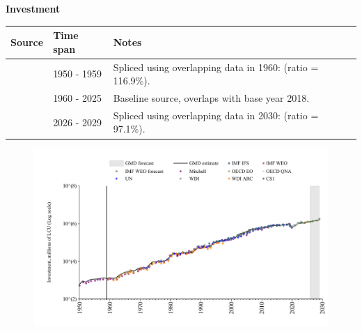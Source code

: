 \documentclass[12pt,a4paper,landscape]{article}
\begin{document}
\begin{adjustbox}{max totalsize={\paperwidth}{\paperheight},center}
\begin{minipage}[t][\textheight][t]{\textwidth}
\vspace*{0.5cm}
{}
\begin{center}
{\Large\bfseries Investment}
\end{center}
\vspace{0.5cm}
\begin{table}[H]
\centering
\small
\begin{tabular}{|l|l|l|}
\hline
\textbf{Source} & \textbf{Time span} & \textbf{Notes} \\
\hline
\rowcolor{white}\cite{Mitchell}& 1950 - 1959 &Spliced using overlapping data in 1960: (ratio = 116.9\%). \\
\rowcolor{lightgray}\cite{OECD_EO}& 1960 - 2025 &Baseline source, overlaps with base year 2018. \\
\rowcolor{white}\cite{IMF_WEO_forecast}& 2026 - 2029 &Spliced using overlapping data in 2030: (ratio = 97.1\%). \\
\hline
\end{tabular}
\end{table}
\begin{figure}[H]
\centering
\includegraphics[width=\textwidth,height=0.6\textheight,keepaspectratio]{graphs/ZAF_inv.pdf}
\end{figure}
\end{minipage}
\end{adjustbox}
\end{document}
